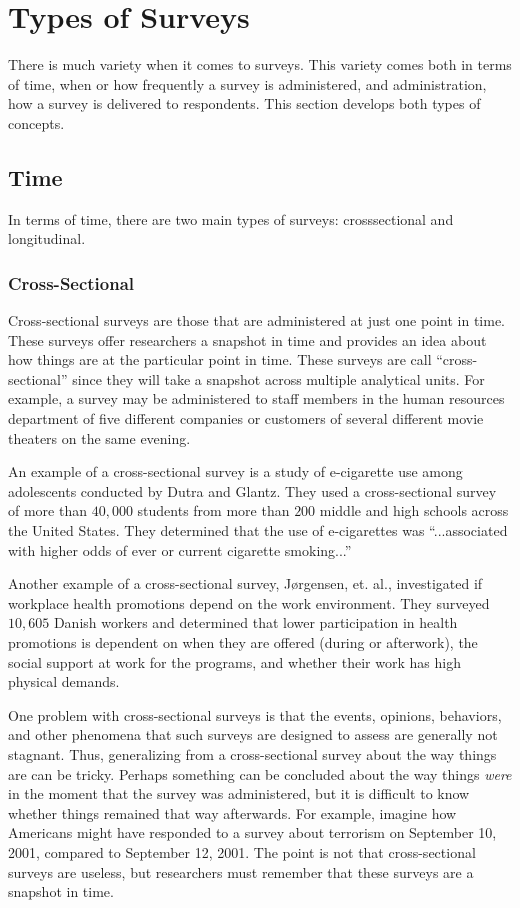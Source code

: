 \section{Types of Surveys}

There is much variety when it comes to surveys. This variety comes both in terms of time, \ie\: when or how frequently a survey is administered, and administration, \ie\: how a survey is delivered to respondents. This section develops both types of concepts.

\subsection{Time}

In terms of time, there are two main types of surveys: \gls{crosssectional} and \gls{longitudinal}.

\subsubsection{Cross-Sectional}

Cross-sectional surveys are those that are administered at just one point in time. These surveys offer researchers a snapshot in time and provides an idea about how things are at the particular point in time. These surveys are call ``cross-sectional'' since they will take a snapshot across multiple analytical units. For example, a survey may be administered to staff members in the human resources department of five different companies or customers of several different movie theaters on the same evening. 

An example of a cross-sectional survey is a study of e-cigarette use among adolescents conducted by Dutra and Glantz\cite{dutra2014electronic}. They used a cross-sectional survey of more than $ 40,000 $ students from more than $ 200 $ middle and high schools across the United States. They determined that the use of e-cigarettes was ``...associated with higher odds of ever or current cigarette smoking...''

Another example of a cross-sectional survey, J\o{}rgensen, et. al.\cite{jorgensen2016does}, investigated if workplace health promotions depend on the work environment. They surveyed $ 10,605 $ Danish workers and determined that lower participation in health promotions is dependent on when they are offered (during or afterwork), the social support at work for the programs, and whether their work has high physical demands.

One problem with cross-sectional surveys is that the events, opinions, behaviors, and other phenomena that such surveys are designed to assess are generally not stagnant. Thus, generalizing from a cross-sectional survey about the way things are can be tricky. Perhaps something can be concluded about the way things \textit{were} in the moment that the survey was administered, but it is difficult to know whether things remained that way afterwards. For example, imagine how Americans might have responded to a survey about terrorism on September 10, 2001, compared to September 12, 2001. The point is not that cross-sectional surveys are useless, but researchers must remember that these surveys are a snapshot in time.

